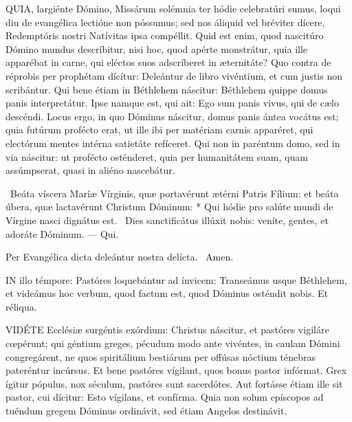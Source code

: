 \lettrine[lines=2]{Q}{UIA}, largiénte Dómino, Missárum solémnia ter hódie celebratúri sumus, loqui diu de evangélica lectióne non póssumus; sed nos áliquid vel bréviter dícere, Redemptóris nostri Natívitas ipsa compéllit. Quid est enim, quod nascitúro Dómino mundus descríbitur, nisi hoc, quod apérte monstrátur, quia ille apparébat in carne, qui eléctos suos adscríberet in æternitáte? Quo contra de réprobis per prophétam dícítur: Deleántur de libro vivéntium, et cum justis non scribántur. Qui bene étiam in Béthlehem náscitur: Béthlehem quippe domus panis interpretátur. Ipse namque est, qui ait: Ego sum panis vivus, qui de cælo descéndi. Locus ergo, in quo Dóminus náscitur, domus panis ántea vocátus est; quia futúrum profécto erat, ut ille ibi per matériam carnis apparéret, qui electórum mentes intérna satietáte refíceret. Qui non in paréntum domo, sed in via náscitur: ut profécto osténderet, quia per humanitátem suam, quam assúmpserat, quasi in aliéno nascebátur.

\R\ Beáta víscera Maríæ Vírginis, quæ portavérunt ætérni Patris Fílium: et beáta úbera, quæ lactavérunt Christum Dóminum: * Qui hódie pro salúte mundi de Vírgine nasci dignátus est. \V\ Dies sanctificátus illúxit nobis: veníte, gentes, et adoráte Dóminum. --- Qui.

 Per Evangélica dicta deleántur nostra delícta. \R\ Amen.



\lettrine[lines=2]{I}{N} illo témpore: Pastóres loquebántur ad ínvicem: Transeámus usque Béthlehem, et videámus hoc verbum, quod factum est, quod Dóminus osténdit nobis. Et réliqua.



\lettrine[lines=2]{V}{IDÉTE} Ecclésiæ surgéntis exórdium: Christus náscitur, et pastóres vigiláre cœpérunt; qui géntium greges, pécudum modo ante vivéntes, in caulam Dómini congregárent, ne quos spiritálium bestiárum per offúsas nóctium ténebras pateréntur incúrsus. Et bene pastóres vígilant, quos bonus pastor infórmat. Grex ígitur pópulus, nox séculum, pastóres sunt sacerdótes. Aut fortásse étiam ille sit pastor, cui dícitur: Esto vígilans, et confírma. Quia non solum epíscopos ad tuéndum gregem Dóminus ordinávit, sed étiam Angelos destinávit.

